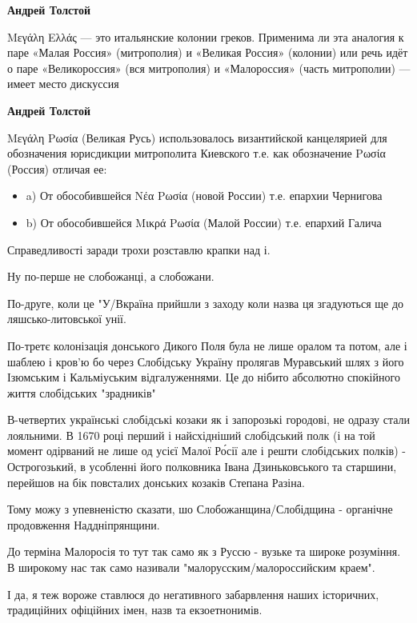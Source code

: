 \begin{itemize}
\begin{itemize}
\textbf{Андрей Толстой} 

Μεγάλη Ελλάς — это итальянские колонии греков. Применима ли эта аналогия к паре
«Малая Россия» (митрополия) и «Великая Россия» (колонии) или речь идёт о паре
«Великороссия» (вся митрополия) и «Малороссия» (часть митрополии) — имеет место
дискуссия

\textbf{Андрей Толстой} 

Μεγάλη Ρωσία (Великая Русь) использовалось византийской канцелярией для
обозначения юрисдикции митрополита Киевского т.е. как обозначение Ρωσία
(Россия) отличая ее:

\begin{itemize}
  \item a) От обособившейся Νέα Ρωσία (новой России) т.е. епархии Чернигова
  \item b) От обособившейся Μικρά Ρωσία (Малой России) т.е. епархий Галича
\end{itemize}

\end{itemize} %


Справедливості заради трохи розставлю крапки над і.

Ну по-перше не слобожанці, а слобожани.

По-друге, коли це "У/Вкраїна прийшли з заходу коли назва ця згадуються ще до
ляшсько-литовської унії.

По-третє колонізація донського Дикого Поля була не лише оралом та потом, але і
шаблею і кров'ю бо через Слобідську Україну пролягав Муравський шлях з його
Ізюмським і Кальміуським відгалуженнями. Це до нібито абсолютно спокійного
життя слобідських "зрадників"

В-четвертих українські слобідські козаки як і запорозькі городові, не одразу
стали лояльними. В 1670 році перший і найсхідніший слобідський полк (і на той
момент одірваний не лише од усієї Малої Ро́сії але і решти слобідських полків) -
Острогозький, в усобленні його полковника Івана Дзиньковського та старшини,
перейшов на бік повсталих донських козаків Степана Разіна.

Тому можу з упевненістю сказати, шо Слобожанщина/Слобідщина - органічне
продовження Наддніпрянщини.

До терміна Малоросія то тут так само як з Руссю - вузьке та широке розуміння. В
широкому нас так само називали "малорусским/малороссийским краем".

І да, я теж вороже ставлюся до негативного забарвлення наших історичних,
традиційних офіційних імен, назв та екзоетнонимів.


\end{itemize}
